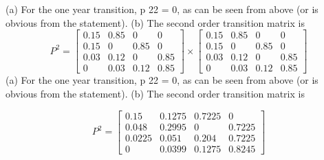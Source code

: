 \documentclass[a4paper,12pt]{article}
\begin{document}
\begin{enumerate}
(a) For the one year transition, p 22 = 0, as can be seen
from above (or is obvious from the statement).
(b) The second order transition matrix is
\[P^2 =  \begin{bmatrix}
0.15 & 0.85 & 0 & 0 \\
0.15 & 0 & 0.85 & 0 \\
0.03 & 0.12 & 0 & 0.85 \\
0 & 0.03 & 0.12 & 0.85 
\end{bmatrix}  \times \begin{bmatrix}
0.15 & 0.85 & 0 & 0 \\
0.15 & 0 & 0.85 & 0 \\
0.03 & 0.12 & 0 & 0.85 \\
0 & 0.03 & 0.12 & 0.85 
\end{bmatrix}  \]
(a) For the one year transition, p 22 = 0, as can be seen
from above (or is obvious from the statement).
(b) The second order transition matrix is

\[ P^2 =\begin{bmatrix}
0.15 & 0.1275 & 0.7225 & 0 \\
0.048 & 0.2995 & 0 & 0.7225 \\
0.0225 & 0.051 & 0.204 & 0.7225 \\
0 & 0.0399 & 0.1275 & 0.8245 
\end{bmatrix}  \]



\end{enumerate}
\end{document}
